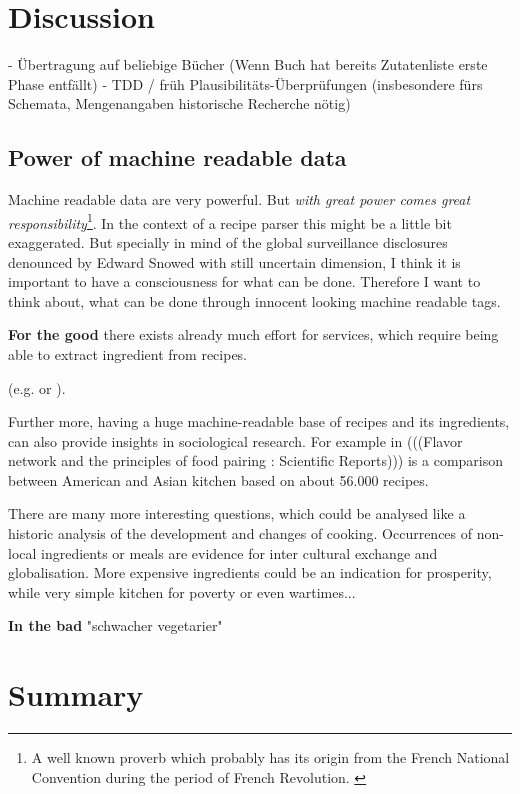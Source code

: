 \documentclass[12pt, twoside]{report}
\begin{document}
\chapter{Discussion}
- Übertragung auf beliebige Bücher (Wenn Buch hat bereits Zutatenliste erste Phase entfällt)
- TDD / früh Plausibilitäts-Überprüfungen (insbesondere fürs Schemata, Mengenangaben historische Recherche nötig)

\section{Power of machine readable data}
Machine readable data are very powerful. But \textit{with great power comes great responsibility}\footnote{A well known proverb which probably has its origin from the French National Convention during the period of French Revolution. \parencite{quoteInvestigator}}. In the context of a recipe parser this might be a little bit exaggerated. But specially in mind of the global surveillance disclosures denounced by Edward Snowed with still uncertain dimension, I think it is important to have a consciousness for what can be done. Therefore I want to think about, what can be done through innocent looking machine readable tags. 
\bigskip

\textbf{For the good} there exists already much effort for services, which require being able to extract ingredient from recipes.

 (e.g. \cite{ingredientNetworks} or \cite{recipeRecommendation}).

Further more, having a huge machine-readable base of recipes and its ingredients, can also provide insights in sociological research. For example in (((Flavor network and the principles of food pairing : Scientific Reports))) is a comparison between American and Asian kitchen based on about 56.000 recipes.

There are many more interesting questions, which could be analysed like a historic analysis of the development and changes of cooking. Occurrences of non-local ingredients or meals are evidence for inter cultural exchange and globalisation. More expensive ingredients could be an indication for prosperity, while very simple kitchen for poverty or even wartimes...
\bigskip

\textbf{In the bad} \parencite{clintonHealth} "schwacher vegetarier"


\chapter{Summary}
\end{document}
